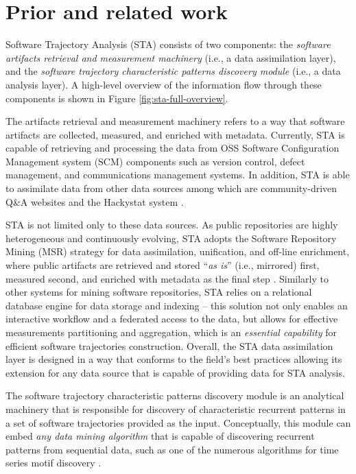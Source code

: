 \chapter{Prior and related work}\label{chapter_background_work}
Software Trajectory Analysis (STA) consists of two components: 
the \textit{software artifacts retrieval and measurement machinery} (i.e., a data assimilation layer), 
and the \textit{software trajectory characteristic patterns discovery module} (i.e., a data analysis layer). 
A high-level overview of the information flow through these components is shown in Figure \ref{fig:sta-full-overview}.

The artifacts retrieval and measurement machinery refers to a way that software artifacts are collected, 
measured, and enriched with metadata. 
Currently, STA is capable of retrieving and processing the data from OSS Software 
Configuration Management system (SCM) components such as version control, 
defect management, and communications management systems. 
In addition, STA is able to assimilate data from other data sources among which are community-driven 
Q\&A websites and the Hackystat system \cite{csdl2-10-09}.

STA is not limited only to these data sources.
As public repositories are highly heterogeneous and continuously evolving, STA adopts the 
Software Repository Mining (MSR) strategy for data assimilation, unification, and off-line enrichment,
where public artifacts are retrieved and stored ``\textit{as is}'' (i.e., mirrored) first, 
measured second, and enriched with metadata as the final step 
\cite{citeulike:12550438} \cite{german04_softchange} \cite{cvsanaly}.
Similarly to other systems for mining software repositories, STA relies on a relational database engine 
for data storage and indexing -- this solution not only enables an interactive workflow and a federated 
access to the data, but allows for effective measurements partitioning and aggregation, which is 
an \textit{essential capability} for efficient software trajectories construction.
Overall, the STA data assimilation layer is designed in a way that conforms to the field's best practices
allowing its extension for any data source that is capable of providing data for STA analysis.

The software trajectory characteristic patterns discovery module is an analytical machinery that 
is responsible for discovery of characteristic recurrent patterns in a set of software trajectories provided as 
the input. Conceptually, this module can embed \textit{any data mining algorithm} that is capable of 
discovering recurrent patterns from sequential data, such as one of the numerous algorithms for time series 
motif discovery \cite{citeulike:13197378}.

